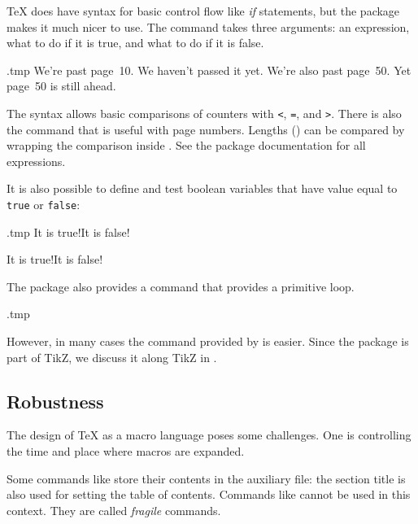 \TeX{} does have syntax for basic control flow like \emph{if} statements,
but the  package makes it much nicer to use.
The  command takes three arguments:
an expression, what to do if it is true, and what to do if it is false.
%
\begin{VerbatimOut}{\jobname.tmp}
    {We're past page~10.}
    {We haven't passed it yet.}
    {We're also past page~50.}
    {Yet page~50 is still ahead.}
\end{VerbatimOut}
\ShowExample
%
The syntax allows basic comparisons of counters with
\verb|<|, \verb|=|, and \verb|>|.
There is also the  command that is useful with page numbers.
Lengths () can be compared by wrapping the comparison inside .
See the package documentation for all expressions.

It is also possible to define and test boolean variables
that have value equal to \verb|true| or \verb|false|:\label{ex:booleans}
%
\begin{VerbatimOut}{\jobname.tmp}
    {It is true!}{It is false!}

    {It is true!}{It is false!}
\end{VerbatimOut}
\ShowExample

The package also provides a  command that provides a primitive loop.
%
\begin{VerbatimOut}{\jobname.tmp}

\end{VerbatimOut}
\ShowExample

However, in many cases the  command provided by  is easier.
Since the  package is part of TikZ,
we discuss it along TikZ in .


%
%
\subsection{Robustness}\label{sec:robustness}

The design of \TeX{} as a macro language poses some challenges.
One is controlling the time and place where macros are expanded.

Some commands like  store their contents in the auxiliary file:
the section title is also used for setting the table of contents.
Commands like  cannot be used in this context.
They are called \emph{fragile} commands.

